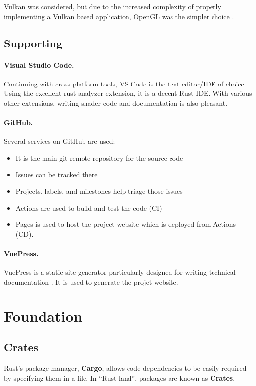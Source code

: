 Vulkan was considered, but due to the increased complexity of properly implementing a Vulkan based application, OpenGL was the simpler choice \autocite{vulkan_vulkan_2020}.

\subsection{Supporting}

\paragraph{Visual Studio Code.}
Continuing with cross-platform tools, VS Code is the text-editor/IDE of choice \autocite{visual_studio_code_visual_2020}.
Using the excellent rust-analyzer extension, it is a decent Rust IDE\@.
With various other extensions, writing shader code and documentation is also pleasant.

\paragraph{GitHub.}
Several services on GitHub \autocite{github_github_2020} are used:
\begin{itemize}
  \item It is the main git remote repository for the source code
  \item Issues can be tracked there
  \item Projects, labels, and milestones help triage those issues
  \item Actions are used to build and test the code (CI)
  \item Pages is used to host the project website which is deployed from Actions (CD).
\end{itemize}

\paragraph{VuePress.}
VuePress is a static site generator particularly designed for writing technical documentation \autocite{vuepress_vuepress_2020}.
It is used to generate the projet website.

\section{Foundation}\label{sec:foundation}

\subsection{Crates}
Rust's package manager, \textbf{Cargo}, allows code dependencies to be easily required by specifying them in a  file.
In “Rust-land”, packages are known as \textbf{Crates}.

